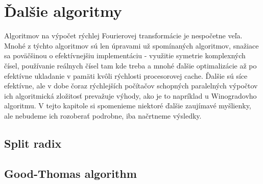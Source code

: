 \section{Ďalšie algoritmy}

Algoritmov na výpočet rýchlej Fourierovej transformácie je nespočetne
veľa. Mnohé z týchto algoritmov sú len úpravami už spomínaných
algoritmov, snažiace sa poväčšinou o efektívnejšiu implementáciu -
využitie symetrie komplexných čísel, používanie reálnych čísel tam kde
treba a mnohé ďalšie optimalizácie až po efektívne ukladanie v pamäti
kvôli rýchlosti procesorovej cache. Ďalšie sú síce efektívne, ale v
dobe čoraz rýchlejších počítačov schopných paralelných výpočtov ich
algoritmická zložitosť prevažuje výhody, ako je to napríklad u
Winogradovho algoritmu. V tejto kapitole si spomenieme
niektoré ďalšie zaujímavé myšlienky, ale nebudeme ich rozoberať
podrobne, iba načrtneme výsledky.

\subsection{Split radix}

\subsection{Good-Thomas algorithm}
